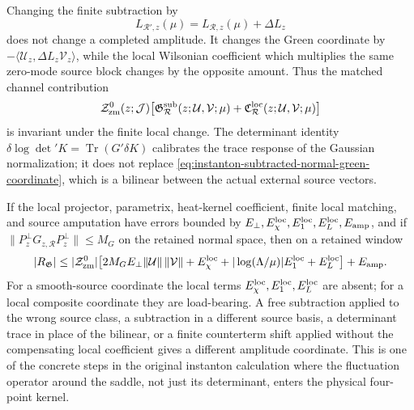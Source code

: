 \begin{controlledapproximation}
Changing the finite subtraction by
\[
  L_{\mathcal R',z}(\mu)
  =
  L_{\mathcal R,z}(\mu)+\Delta L_z
\]
does not change a completed amplitude.  It changes the Green coordinate by
\(-\langle\mathcal U_z,\Delta L_z\mathcal V_z\rangle\), while the local
Wilsonian coefficient which multiplies the same zero-mode source block
changes by the opposite amount.  Thus the matched channel contribution
\begin{equation}
  \mathcal Z_{\rm zm}^0(z;\mathcal J)
  \bigl[
    \mathfrak G_{\mathcal R}^{\rm sub}
    (z;\mathcal U,\mathcal V;\mu)
    +\mathfrak C_{\mathcal R}^{\rm loc}
    (z;\mathcal U,\mathcal V;\mu)
  \bigr]
  \label{eq:instanton-subtracted-normal-green-matched-channel}
\end{equation}
is invariant under the finite local change.  The determinant identity
\(\delta\log\det'K=\operatorname{Tr}(G'\delta K)\) calibrates the trace response of the
Gaussian normalization; it does not replace
\eqref{eq:instanton-subtracted-normal-green-coordinate}, which is a bilinear
between the actual external source vectors.

If the local projector, parametrix, heat-kernel coefficient, finite local
matching, and source amputation have errors bounded by
\(E_\perp,E_\chi^{\rm loc},E_{1}^{\rm loc},E_L^{\rm loc},E_{\rm amp}\), and
if \(\|P_z^\perp G_{z,\mathcal R}P_z^\perp\|\le M_G\) on the retained normal
space, then on a retained window
\begin{equation}
  |R_{\mathfrak G}|
  \le
  |\mathcal Z_{\rm zm}^0|
  \bigl[
    2M_G E_\perp\|\mathcal U\|\,\|\mathcal V\|
    +E_\chi^{\rm loc}
    +|\log(\Lambda/\mu)|E_1^{\rm loc}
    +E_L^{\rm loc}
  \bigr]
  +E_{\rm amp}.
  \label{eq:instanton-subtracted-normal-green-residual-bound}
\end{equation}
For a smooth-source coordinate the local terms
\(E_\chi^{\rm loc},E_1^{\rm loc},E_L^{\rm loc}\) are absent; for a local
composite coordinate they are load-bearing.  A free subtraction applied to the
wrong source class, a subtraction in a different source basis, a determinant
trace in place of the bilinear, or a finite counterterm shift applied without
the compensating local coefficient gives a different amplitude coordinate.
This is one of the concrete steps in the original instanton calculation where
the fluctuation operator around the saddle, not just its determinant, enters
the physical four-point kernel.
\end{controlledapproximation}

